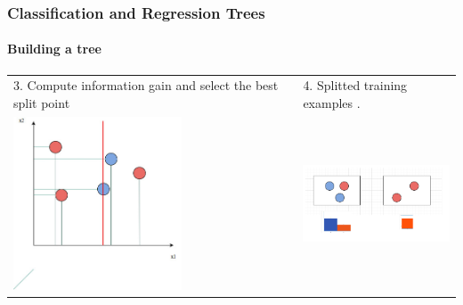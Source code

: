 \begin{frame}
	\frametitle{Classification and Regression Trees}
		\framesubtitle{Building a tree}

		\begin{center}
		\begin{tabular}{m{5cm} m{5cm}}
		3. Compute information gain and select the best split point
		&
		4. Splitted training examples .\\
		\includegraphics[width=5cm]{./figures/macierz4}
		&
		\includegraphics[width=5cm]{./figures/macierz5}
		\\
		\end{tabular}
		\end{center}
		
\end{frame}

